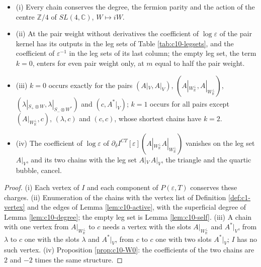 \begin{proposition}[Census]
\label{prop:c10-census}
\begin{itemize}
\item (i) Every chain conserves the degree, the fermion parity and the action of the centre $\mathbb Z/4$ of $SL(4,\mathbb C)$, $W\mapsto iW$.
\item (ii) At the pair weight without derivatives the coefficient of $\log\varepsilon$ of the pair kernel has its outputs in the leg sets of Table \ref{tab:c10-legsets}, and the coefficient of $\varepsilon^{-1}$ in the leg sets of its last column; the empty leg set, the term $k=0$, enters for even pair weight only, at $m$ equal to half the pair weight.
\item (iii) $k=0$ occurs exactly for the pairs $(A|_V,A|_V)$, $(A|_{W_{\mathbb R}^\perp},A|_{W_{\mathbb R}^\perp})$, $(\lambda|_{S_+\otimes W},\lambda|_{S_-\otimes W^*})$ and $(c,A^*|_V)$; $k=1$ occurs for all pairs except $(A|_{W_{\mathbb R}^\perp},c)$, $(\lambda,c)$ and $(c,c)$, whose shortest chains have $k=2$.
\item (iv) The coefficient of $\log\varepsilon$ of $\partial_\delta I^{CT}[\varepsilon](A|_{W_{\mathbb R}^\perp}A|_{W_{\mathbb R}^\perp})$ vanishes on the leg set $A|_V$, and its two chains with the leg set $A|_V\,A|_V$, the triangle and the quartic bubble, cancel.
\end{itemize}
\end{proposition}

\begin{proof}
(i) Each vertex of $I$ and each component of $P(\varepsilon,T)$ conserves these charges. (ii) Enumeration of the chains with the vertex list of Definition \ref{def:c1-vertex} and the edges of Lemma \ref{lem:c10-active}, with the superficial degree of Lemma \ref{lem:c10-degree}; the empty leg set is Lemma \ref{lem:c10-self}. (iii) A chain with one vertex from $A|_{W_{\mathbb R}^\perp}$ to $c$ needs a vertex with the slots $A|_{W_{\mathbb R}^\perp}$ and $A^*|_V$, from $\lambda$ to $c$ one with the slots $\lambda$ and $A^*|_V$, from $c$ to $c$ one with two slots $A^*|_V$; $I$ has no such vertex. (iv) Proposition \ref{prop:c10-W0}: the coefficients of the two chains are $2$ and $-2$ times the same structure.
\end{proof}

